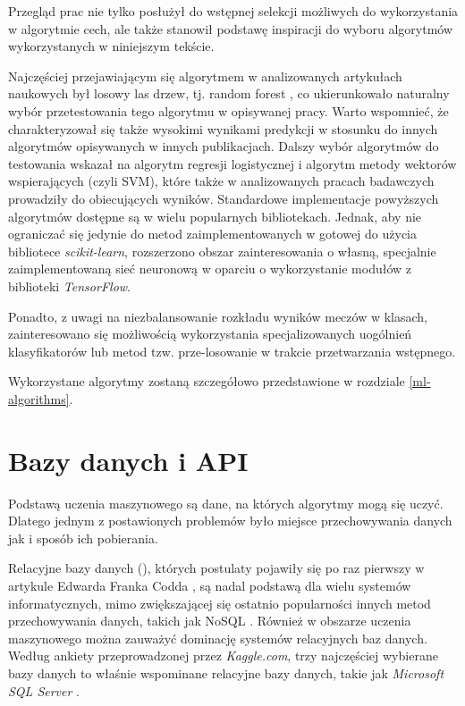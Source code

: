 Przegląd prac nie tylko posłużył do wstępnej selekcji możliwych do wykorzystania w algorytmie cech, ale także stanowił podstawę inspiracji do wyboru algorytmów wykorzystanych w niniejszym tekście. 

Najczęściej przejawiającym się algorytmem w analizowanych artykułach naukowych był losowy las drzew, tj. random forest \cite{CanMLPrecict} \cite{KagglePredict} \cite{BundesligaPredict} \cite{TowardDataPredict}, co ukierunkowało naturalny wybór przetestowania tego algorytmu w opisywanej pracy. Warto wspomnieć, że charakteryzował się także wysokimi wynikami predykcji w stosunku do innych algorytmów opisywanych w innych publikacjach. Dalszy wybór algorytmów do testowania wskazał na algorytm regresji logistycznej i algorytm metody wektorów wspierających (czyli SVM), które także w analizowanych pracach badawczych \cite{CanMLPrecict} \cite{KagglePredict} prowadziły do  obiecujących wyników. Standardowe implementacje powyższych algorytmów dostępne są w wielu popularnych bibliotekach. Jednak, aby nie ograniczać się jedynie do metod zaimplementowanych w gotowej do użycia bibliotece \textit{scikit-learn}, rozszerzono obszar zainteresowania o własną, specjalnie zaimplementowaną sieć neuronową \cite{CanMLPrecict} \cite{BundesligaPredict} w oparciu o wykorzystanie modułów z biblioteki \textit{TensorFlow}. 

Ponadto, z uwagi na niezbalansowanie rozkładu wyników meczów w klasach, zainteresowano się możliwością wykorzystania specjalizowanych uogólnień klasyfikatorów lub metod tzw. prze-losowanie w trakcie przetwarzania wstępnego.

Wykorzystane algorytmy zostaną szczegółowo przedstawione w rozdziale \ref{ml-algorithms}.

\section{Bazy danych i API}
\noindent Podstawą uczenia maszynowego są dane, na których algorytmy mogą się uczyć. Dlatego jednym z postawionych problemów było miejsce przechowywania danych jak i sposób ich pobierania.

Relacyjne bazy danych (), których postulaty pojawiły się po raz pierwszy w artykule Edwarda Franka Codda \cite{Codd}, są nadal podstawą dla wielu systemów informatycznych, mimo zwiększającej się ostatnio popularności innych metod przechowywania danych, takich jak NoSQL \cite{RBD_popularity_2016}. Również w obszarze uczenia maszynowego można zauważyć dominację systemów relacyjnych baz danych. Według ankiety przeprowadzonej przez \textit{Kaggle.com}, trzy najczęściej wybierane bazy danych to właśnie wspominane relacyjne bazy danych, takie jak \textit{Microsoft SQL Server} \cite{RDB_popularity_kaggle_2020}.

